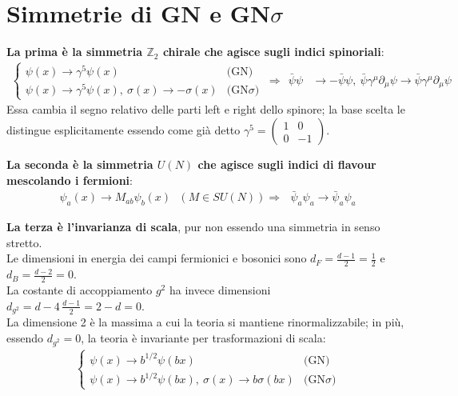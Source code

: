 \documentclass[a4paper,11pt]{amsart}
\newcommand{\nl}{\vskip 0.3cm}
\newcommand{\np}{\vskip 1.3cm}
\newcommand{\psibar}{\bar{\psi}}
\newcommand{\demu}[1]{\partial#1{\mu}}
\newcommand{\ssection}[2]{\section{ \texorpdfstring{\textbf{#1}}{#2} }}
\begin{document}
\ssection{Simmetrie di GN e GN$\sigma$}{Simmetrie}
\textbf{La prima è la simmetria $\mathbb{Z}_2 $ chirale che agisce sugli indici spinoriali}:
\begin{align*}
 \begin{cases}
  \psi(x) \to \gamma^5\psi(x) &\text{(GN)}\\
  \psi(x) \to \gamma^5\psi(x),\ \sigma(x) \to - \sigma(x) &\text{(GN}\sigma\text{)}
 \end{cases}
 \ \Rightarrow\ \ \psibar \psi &\to -\psibar\psi,\ \psibar \gamma^{\mu}\demu{_}\psi \to \psibar \gamma^{\mu}\demu{_}\psi
\end{align*}
Essa cambia il segno relativo delle parti left e right dello spinore; la base scelta le distingue esplicitamente essendo come già detto 
$\gamma^5 = \begin{pmatrix}
              1 & 0 \\
              0 & -1
            \end{pmatrix}$.
\nl 
            
\textbf{La seconda è la simmetria $U(N)$ che agisce sugli indici di flavour mescolando i fermioni}:
\begin{align*}
 \psi_a(x) \to M_{ab}\psi_b(x)\ \ \ (M\in SU(N)) \Rightarrow\ \ \ \psibar_a\psi_a \to \psibar_a\psi_a 
\end{align*}
\nl

\textbf{La terza è l'invarianza di scala}, pur non essendo una simmetria in senso stretto.\\
Le dimensioni in energia dei campi fermionici e bosonici sono $d_F = \frac{d-1}{2} = \frac{1}{2}$ e $d_B = \frac{d-2}{2} = 0$.\\ 
La costante di accoppiamento $g^2$ ha invece dimensioni $d_{g^2} = d - 4\,\frac{d-1}{2} = 2 - d = 0$.\\ 
La dimensione 2 è la massima a cui la teoria si mantiene rinormalizzabile; in più, essendo $d_{g^2} = 0$, la teoria è invariante per trasformazioni di scala:
\begin{align*}
 \begin{cases}
  \psi(x) \to b^{1/2}\psi(bx) &\text{(GN)}\\
  \psi(x) \to b^{1/2}\psi(bx),\ \sigma(x) \to b\sigma(bx) &\text{(GN}\sigma\text{)}
 \end{cases}
\end{align*}
\np
\end{document}
